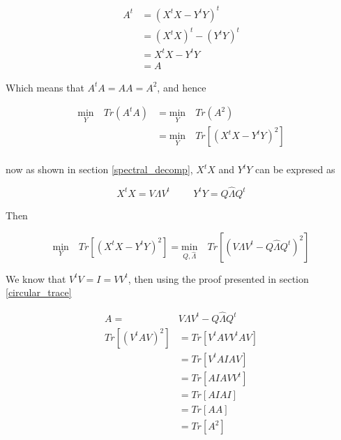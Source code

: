 \documentclass[12pt,journal]{IEEEtran}
\begin{document}
    \begin{equation*}
        \begin{aligned}
            A^t &= (X^tX - Y^tY)^t\\
                &= (X^tX)^t - (Y^tY)^t\\
                &= X^tX - Y^tY\\
                &= A
        \end{aligned}
    \end{equation*}

    Which means that $A^tA = AA = A^2$, and hence

    \begin{equation*}
        \begin{aligned}
            \underset{Y}{\text{min}} \quad Tr(A^tA)
            &=
            \underset{Y}{\text{min}} \quad Tr(A^2)\\
            &=
            \underset{Y}{\text{min}} \quad Tr[(X^tX - Y^tY)^2]
        \end{aligned}
    \end{equation*}\\

    now as shown in section \ref{spectral_decomp}, $X^tX$ and $Y^tY$ can be
    expresed as

    \begin{equation*}
        X^tX = V\Lambda V^t \hspace{1cm} Y^tY = Q \hat{\Lambda} Q^t
    \end{equation*}

    Then

    \begin{equation*}
        \underset{Y}{\text{min}} \quad Tr[(X^tX - Y^tY)^2]
        =
        \underset{Q,\hat{\Lambda}}{\text{min}} \quad Tr[(V\Lambda V^t - Q \hat{\Lambda} Q^t)^2]
    \end{equation*}

    We know that $V^tV = I = VV^t$, then using the proof presented in section \ref{circular_trace}

    \begin{equation*}
        \begin{aligned}
            A =& V\Lambda V^t - Q \hat{\Lambda} Q^t\\
            Tr[(V^tAV)^2] &= Tr[V^tAVV^tAV]\\
                          &= Tr[V^tAIAV]\\
                          &= Tr[AIAVV^t]\\
                          &= Tr[AIAI]\\
                          &= Tr[AA]\\
                          &= Tr[A^2]\\
        \end{aligned}
    \end{equation*}\\
\end{document}
